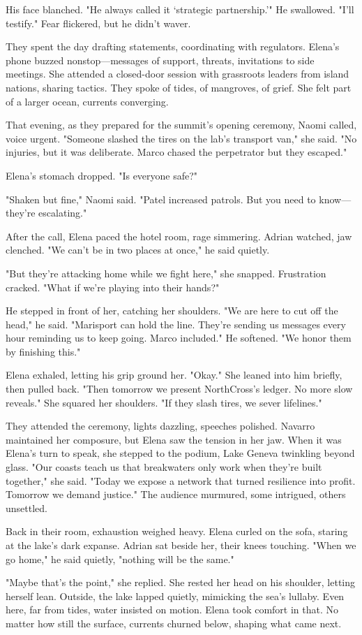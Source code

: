 His face blanched. "He always called it `strategic partnership.'" He swallowed. "I'll testify." Fear flickered, but he didn't waver.

They spent the day drafting statements, coordinating with regulators. Elena's phone buzzed nonstop—messages of support, threats, invitations to side meetings. She attended a closed-door session with grassroots leaders from island nations, sharing tactics. They spoke of tides, of mangroves, of grief. She felt part of a larger ocean, currents converging.

That evening, as they prepared for the summit's opening ceremony, Naomi called, voice urgent. "Someone slashed the tires on the lab's transport van," she said. "No injuries, but it was deliberate. Marco chased the perpetrator but they escaped."

Elena's stomach dropped. "Is everyone safe?"

"Shaken but fine," Naomi said. "Patel increased patrols. But you need to know—they're escalating."

After the call, Elena paced the hotel room, rage simmering. Adrian watched, jaw clenched. "We can't be in two places at once," he said quietly.

"But they're attacking home while we fight here," she snapped. Frustration cracked. "What if we're playing into their hands?"

He stepped in front of her, catching her shoulders. "We are here to cut off the head," he said. "Marisport can hold the line. They're sending us messages every hour reminding us to keep going. Marco included." He softened. "We honor them by finishing this."

Elena exhaled, letting his grip ground her. "Okay." She leaned into him briefly, then pulled back. "Then tomorrow we present NorthCross's ledger. No more slow reveals." She squared her shoulders. "If they slash tires, we sever lifelines."

They attended the ceremony, lights dazzling, speeches polished. Navarro maintained her composure, but Elena saw the tension in her jaw. When it was Elena's turn to speak, she stepped to the podium, Lake Geneva twinkling beyond glass. "Our coasts teach us that breakwaters only work when they're built together," she said. "Today we expose a network that turned resilience into profit. Tomorrow we demand justice." The audience murmured, some intrigued, others unsettled.

Back in their room, exhaustion weighed heavy. Elena curled on the sofa, staring at the lake's dark expanse. Adrian sat beside her, their knees touching. "When we go home," he said quietly, "nothing will be the same."

"Maybe that's the point," she replied. She rested her head on his shoulder, letting herself lean. Outside, the lake lapped quietly, mimicking the sea's lullaby. Even here, far from tides, water insisted on motion. Elena took comfort in that. No matter how still the surface, currents churned below, shaping what came next.

